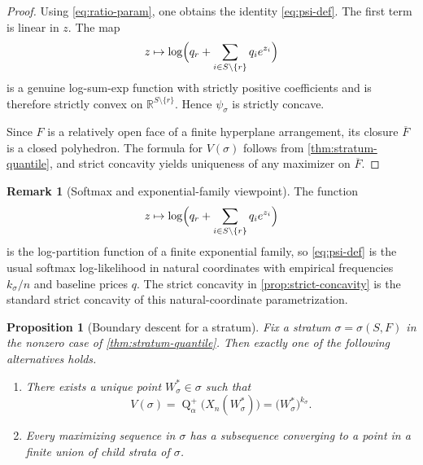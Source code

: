 \documentclass[11pt]{article}
\newtheorem{proposition}[proposition]{Proposition}
\theoremstyle{definition}
\newtheorem{remark}[remark]{Remark}
\newcommand{\R}{\mathbb{R}}
\newcommand{\1}{\mathbf{1}}
\newcommand{\Quant}{\operatorname{Q}}
\begin{document}
\begin{proof}
Using \eqref{eq:ratio-param}, one obtains the identity \eqref{eq:psi-def}. The first term is linear in $z$. The map
\[
z\mapsto \log\Bigl(q_r+\sum_{i\in S\setminus\{r\}} q_i e^{z_i}\Bigr)
\]
is a genuine log-sum-exp function with strictly positive coefficients and is therefore strictly convex on $\R^{S\setminus\{r\}}$. Hence $\psi_\sigma$ is strictly concave.

Since $F$ is a relatively open face of a finite hyperplane arrangement, its closure $\overline F$ is a closed polyhedron. The formula for $V(\sigma)$ follows from \cref{thm:stratum-quantile}, and strict concavity yields uniqueness of any maximizer on $\overline F$.
\end{proof}

\begin{remark}[Softmax and exponential-family viewpoint]
The function
\[
z\mapsto \log\Bigl(q_r+\sum_{i\in S\setminus\{r\}} q_i e^{z_i}\Bigr)
\]
is the log-partition function of a finite exponential family, so \cref{eq:psi-def} is the usual softmax log-likelihood in natural coordinates with empirical frequencies $k_\sigma/n$ and baseline prices $q$. The strict concavity in \cref{prop:strict-concavity} is the standard strict concavity of this natural-coordinate parametrization.
\end{remark}

\begin{proposition}[Boundary descent for a stratum]\label{prop:boundary-descent}
Fix a stratum $\sigma=\sigma(S,F)$ in the nonzero case of \cref{thm:stratum-quantile}. Then exactly one of the following alternatives holds.
\begin{enumerate}[label=(\roman*), itemsep=3pt]
  \item There exists a unique point $W_\sigma^*\in\sigma$ such that
  \[
  V(\sigma)=\Quant_\alpha^+\bigl(X_n(W_\sigma^*)\bigr)=\bigl(W_\sigma^*\bigr)^{k_\sigma}.
  \]
  \item Every maximizing sequence in $\sigma$ has a subsequence converging to a point in a finite union of child strata of $\sigma$.
\end{enumerate}
\end{proposition}
\end{document}
